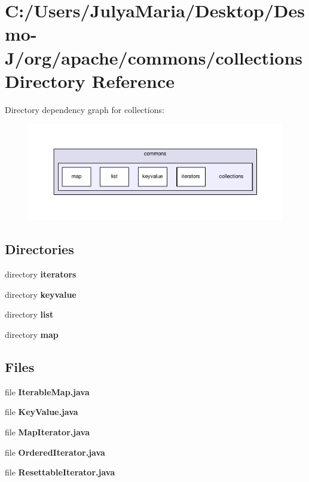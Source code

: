 \section{C\-:/\-Users/\-Julya\-Maria/\-Desktop/\-Desmo-\/\-J/org/apache/commons/collections Directory Reference}
\label{dir_d1c60ede34db808e8770818d7590dfd5}
Directory dependency graph for collections\-:
\nopagebreak
\begin{figure}[H]
\begin{center}
\leavevmode
\includegraphics[width=350pt]{dir_d1c60ede34db808e8770818d7590dfd5_dep}
\end{center}
\end{figure}
\subsection*{Directories}
\begin{DoxyCompactItemize}
\item 
directory {\bf iterators}
\item 
directory {\bf keyvalue}
\item 
directory {\bf list}
\item 
directory {\bf map}
\end{DoxyCompactItemize}
\subsection*{Files}
\begin{DoxyCompactItemize}
\item 
file {\bfseries Iterable\-Map.\-java}
\item 
file {\bfseries Key\-Value.\-java}
\item 
file {\bfseries Map\-Iterator.\-java}
\item 
file {\bfseries Ordered\-Iterator.\-java}
\item 
file {\bfseries Resettable\-Iterator.\-java}
\end{DoxyCompactItemize}

